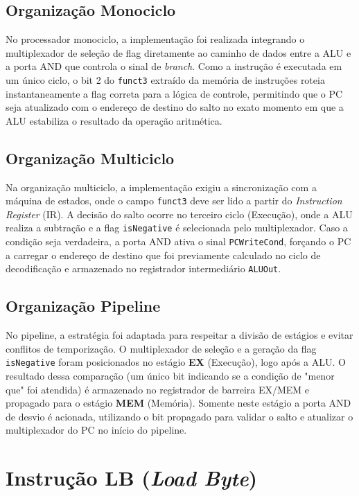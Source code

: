 \documentclass{article}
\begin{document}
\subsection{Organização Monociclo}
No processador monociclo, a implementação foi realizada integrando o multiplexador de seleção de flag diretamente ao caminho de dados entre a ALU e a porta AND que controla o sinal de \textit{branch}. Como a instrução é executada em um único ciclo, o bit 2 do \texttt{funct3} extraído da memória de instruções roteia instantaneamente a flag correta para a lógica de controle, permitindo que o PC seja atualizado com o endereço de destino do salto no exato momento em que a ALU estabiliza o resultado da operação aritmética.

\subsection{Organização Multiciclo}
Na organização multiciclo, a implementação exigiu a sincronização com a máquina de estados, onde o campo \texttt{funct3} deve ser lido a partir do \textit{Instruction Register} (IR). A decisão do salto ocorre no terceiro ciclo (Execução), onde a ALU realiza a subtração e a flag \texttt{isNegative} é selecionada pelo multiplexador. Caso a condição seja verdadeira, a porta AND ativa o sinal \texttt{PCWriteCond}, forçando o PC a carregar o endereço de destino que foi previamente calculado no ciclo de decodificação e armazenado no registrador intermediário \texttt{ALUOut}.

\subsection{Organização Pipeline}
No pipeline, a estratégia foi adaptada para respeitar a divisão de estágios e evitar conflitos de temporização. O multiplexador de seleção e a geração da flag \texttt{isNegative} foram posicionados no estágio \textbf{EX} (Execução), logo após a ALU. O resultado dessa comparação (um único bit indicando se a condição de "menor que" foi atendida) é armazenado no registrador de barreira EX/MEM e propagado para o estágio \textbf{MEM} (Memória). Somente neste estágio a porta AND de desvio é acionada, utilizando o bit propagado para validar o salto e atualizar o multiplexador do PC no início do pipeline.

\section{Instrução LB (\textit{Load Byte})}
\end{document}
